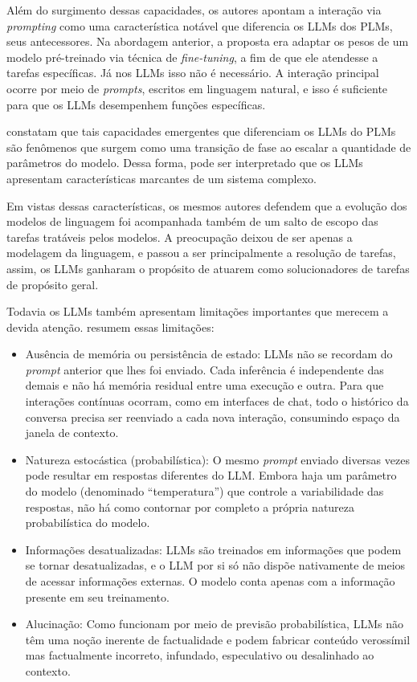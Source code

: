 \documentclass[12pt,oneside,a4paper,brazil,sumario=tradicional]{abntex2}
\begin{document}
Além do surgimento dessas capacidades, os autores apontam a interação via \textit{prompting} como uma característica notável que diferencia os LLMs dos PLMs, seus antecessores. Na abordagem anterior, a proposta era adaptar os pesos de um modelo pré-treinado via técnica de \textit{fine-tuning}, a fim de que ele atendesse a tarefas específicas. Já nos LLMs isso não é necessário. A interação principal ocorre por meio de \textit{prompts}, escritos em linguagem natural, e isso é suficiente para que os LLMs desempenhem funções específicas.

\textcite{zhao2023} constatam que tais capacidades emergentes que diferenciam os LLMs do PLMs são fenômenos que surgem como uma transição de fase ao escalar a quantidade de parâmetros do modelo. Dessa forma, pode ser interpretado que os LLMs apresentam características marcantes de um sistema complexo.

Em vistas dessas características, os mesmos autores defendem que a evolução dos modelos de linguagem foi acompanhada também de um salto de escopo das tarefas tratáveis pelos modelos. A preocupação deixou de ser apenas a modelagem da linguagem, e passou a ser principalmente a resolução de tarefas, assim, os LLMs ganharam o propósito de atuarem como solucionadores de tarefas de propósito geral.

Todavia os LLMs também apresentam limitações importantes que merecem a devida atenção. \textcite{minaee2024} resumem essas limitações:

\begin{itemize}
  \item Ausência de memória ou persistência de estado: LLMs não se recordam do \textit{prompt }anterior que lhes foi enviado. Cada inferência é independente das demais e não há memória residual entre uma execução e outra.  Para que interações contínuas ocorram, como em interfaces de chat, todo o histórico da conversa precisa ser reenviado a cada nova interação, consumindo espaço da janela de contexto.
  \item Natureza estocástica (probabilística): O mesmo \textit{prompt }enviado diversas vezes pode resultar em respostas diferentes do LLM. Embora haja um parâmetro do modelo (denominado “temperatura”) que controle a variabilidade das respostas, não há como contornar por completo a própria natureza probabilística do modelo.
  \item Informações desatualizadas: LLMs são treinados em informações que podem se tornar desatualizadas, e o LLM por si só não dispõe nativamente de meios de acessar informações externas. O modelo conta apenas com a informação presente em seu treinamento.
  \item Alucinação: Como funcionam por meio de previsão probabilística, LLMs não têm uma noção inerente de factualidade e podem fabricar conteúdo verossímil mas factualmente incorreto, infundado, especulativo ou desalinhado ao contexto.
\end{itemize}
\end{document}
